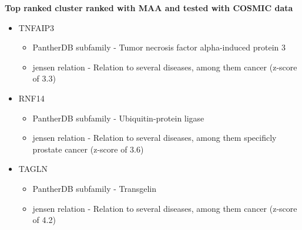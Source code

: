 \textbf{Top ranked cluster ranked with MAA and tested with COSMIC data}

\begin{itemize}
    \item TNFAIP3
        \begin{itemize}
            \item PantherDB subfamily - Tumor necrosis factor alpha-induced
                protein 3
            \item \gls{jensen} relation - Relation to several diseases, among them
                cancer (z-score of 3.3)
        \end{itemize}
    \item RNF14
        \begin{itemize}
            \item PantherDB subfamily - Ubiquitin-protein ligase
            \item \gls{jensen} relation - Relation to several diseases, among them
                specificly prostate cancer (z-score of 3.6)
        \end{itemize}
    \item TAGLN
        \begin{itemize}
            \item PantherDB subfamily - Transgelin
            \item \gls{jensen} relation - Relation to several diseases, among them
                cancer (z-score of 4.2)
        \end{itemize}
\end{itemize}


